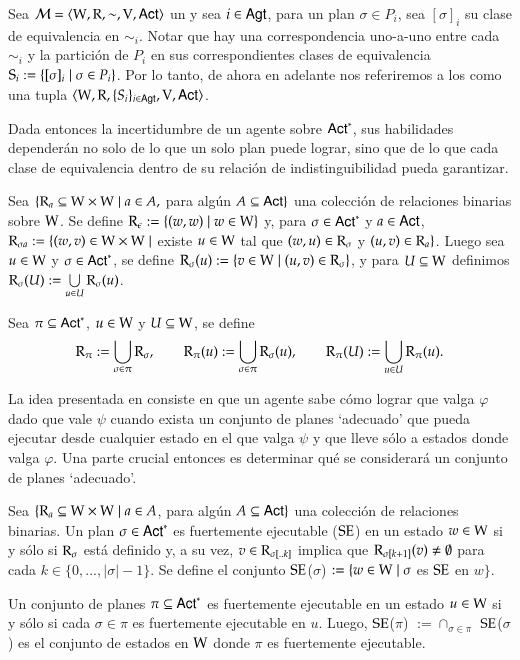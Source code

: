 Sea $\model = \tup{\W,\R,\sim,\V,\ACT}$ un \ults y sea $i \in \AGT$, para un plan $\sigma \in P_i$, sea $[\sigma]_i$ su clase de 
equivalencia en $\sim_i$. Notar que hay una correspondencia uno-a-uno entre cada $\sim_i$ y la partición de $P_i$ en sus correspondientes 
clases de equivalencia $\S_i := \{[\sigma]_i \mid \sigma \in P_i\}$. Por lo tanto, de ahora en adelante nos referiremos a los \ults como
una tupla $\tup{\W,\R,\{S_i\}_{i \in \AGT},\V,\ACT}$.

Dada entonces la incertidumbre de un agente sobre $\ACT^*$, sus habilidades dependerán no solo de lo que un solo plan puede lograr, sino que de 
lo que cada clase de equivalencia dentro de su relación de indistinguibilidad pueda garantizar.


\begin{definicion}
    Sea $\{\R_a \subseteq \W \times \W \mid a \in A,$ para algún $A \subseteq \ACT \}$ una colección de relaciones binarias sobre $\W$. 
    Se define $\R_\epsilon := \{(w,w) \mid w \in \W\}$ y, para $\sigma \in \ACT^*$ y $a \in \ACT$, 
    $\R_{\sigma a} := \{(w,v) \in \W \times \W \mid$ existe $u \in \W$ tal que $(w,u) \in \R_\sigma$ y $(u,v) \in \R_a \}$. 
    Luego sea $u \in \W$ y $\sigma \in \ACT^*$, se define $\R_\sigma(u) := \{v\in\W \mid (u,v) \in \R_\sigma\}$, y para $U\subseteq\W$ 
    definimos $\R_\sigma(U) := \bigcup\limits_{u \in U} \R_\sigma(u)$.

    Sea $\pi \subseteq \ACT^*$, $u \in \W$ y $U \subseteq \W$, se define
    \[
        \R_\strategy := \bigcup_{\sigma \in \strategy} \R_{\sigma},
    \qquad
        \R_{\strategy}(u) := \bigcup_{\sigma \in \strategy} \R_\sigma(u),
    \qquad
        \R_{\strategy}(U) := \bigcup_{u \in U} \R_{\strategy}(u).
    \]
\end{definicion}

La idea presentada en \cite{ArecesFSV25,SaraviaPHD} consiste en que un agente sabe cómo lograr que valga $\varphi$ dado que vale $\psi$ cuando exista un 
conjunto de planes `adecuado' que pueda ejecutar desde cualquier estado en el que valga $\psi$ y que lleve sólo a estados donde valga $\varphi$. 
Una parte crucial entonces es determinar qué se considerará un conjunto de planes `adecuado'.

\begin{definicion}
    Sea $\{\R_a \subseteq \W \times \W \mid a \in A$, para algún $A \subseteq \ACT\}$ una colección de relaciones binarias. Un plan $\sigma \in \ACT^*$
    es fuertemente ejecutable ($\sexec$) en un estado $w \in \W$ si y sólo si $\R_\sigma$ está definido y, a su vez, $v \in \R_{\sigma[..k]}$ implica que 
    $\R_{\sigma[k+1]}(v) \neq \emptyset$ para cada $k \in \{0,...,|\sigma|-1\}$. Se define el conjunto $\sexec$($\sigma$) $:= \{w \in \W \mid \sigma$ es $\sexec$ en $w\}$.
    
    Un conjunto de planes $\pi \subseteq \ACT^*$ es fuertemente ejecutable en un estado $u \in \W$ si y sólo si cada $\sigma \in \pi$ es fuertemente ejecutable en $u$.
    Luego, $\sexec$($\pi$) $:= \cap_{\sigma \in \pi}$ $\sexec$($\sigma$) es el conjunto de estados en $\W$ donde $\pi$ es fuertemente ejecutable. 
\end{definicion}

